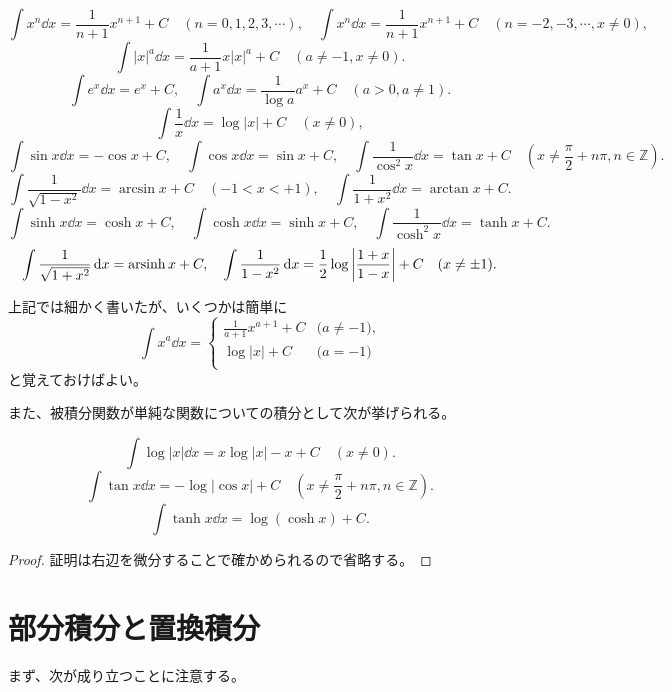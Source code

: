 \begin{proposition}[種々の関数の積分１]
$$
\int x^n\dd{x} = \frac{1}{n+1}x^{n+1}+C \quad (n = 0, 1, 2, 3, \cdots),
\quad \int x^n\dd{x} = \frac{1}{n+1}x^{n+1}+C \quad (n = -2, -3, \cdots, x \ne 0),
$$
$$
\int |x|^a\dd{x} = \frac{1}{a+1}x|x|^a+C \quad (a \ne -1, x \ne 0).
$$
$$
\int e^x\dd{x} = e^x+C,
\quad \int a^x\dd{x} = \frac{1}{\log a}a^x+C \quad (a > 0, a \ne 1).
$$
$$
\int \frac{1}{x}\dd{x} = \log|x|+C \quad (x \ne 0),
$$
$$
\int \sin x\dd{x} = -\cos x+C,
\quad \int \cos x\dd{x} = \sin x+C,
\quad \int \frac{1}{\cos^2 x}\dd{x} = \tan x+C \quad (x \ne \frac{\pi}{2}+n\pi, n \in \mathbb{Z}).
$$
$$
\int \frac{1}{\sqrt{1-x^2}}\dd{x} = \arcsin x+C \quad (-1 < x < +1),
\quad \int \frac{1}{1+x^2}\dd{x} = \arctan x+C.
$$
$$
\int \sinh x\dd{x} = \cosh x+C,
\quad \int \cosh x\dd{x} = \sinh x+C,
\quad \int \frac{1}{\cosh^2 x}\dd{x} = \tanh x+C.
$$
$$
\int \frac{1}{\sqrt{1+x^2}}\dd{x} = \operatorname{arsinh} x+C,
\quad \int \frac{1}{1-x^2}\dd{x} = \frac{1}{2}\log\abs{\frac{1+x}{1-x}}+C \quad (x \ne \pm 1).
$$
\end{proposition}

\begin{remark}
上記では細かく書いたが、いくつかは簡単に
$$
\int x^a\dd{x} =
\begin{cases}
\frac{1}{a+1}x^{a+1}+C & \text{($a \ne -1$),} \\
\log|x|+C & \text{($a = -1$)} \\
\end{cases}
$$
と覚えておけばよい。
\end{remark}

また、被積分関数が単純な関数についての積分として次が挙げられる。

\begin{proposition}[種々の関数の積分２]
$$
\int \log |x|\dd{x} = x\log |x|-x+C \quad (x \ne 0).
$$
$$
\int \tan x\dd{x} = -\log|\cos x|+C \quad (x \ne \frac{\pi}{2}+n\pi, n \in \mathbb{Z}).
$$
$$
\int \tanh x\dd{x} = \log(\cosh x)+C.
$$
\end{proposition}

\begin{proof}
証明は右辺を微分することで確かめられるので省略する。
\end{proof}

\section{部分積分と置換積分}

まず、次が成り立つことに注意する。

